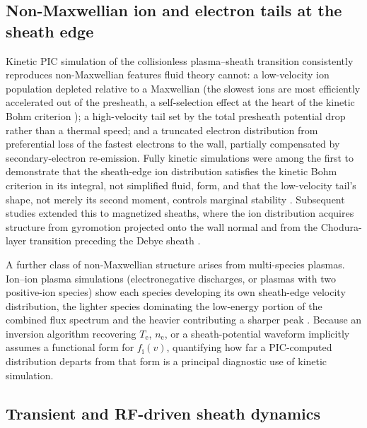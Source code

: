 \subsection{Non-Maxwellian ion and electron tails at the sheath edge}

Kinetic PIC simulation of the collisionless plasma--sheath transition consistently reproduces non-Maxwellian features fluid theory cannot: a low-velocity ion population depleted relative to a Maxwellian (the slowest ions are most efficiently accelerated out of the presheath, a self-selection effect at the heart of the kinetic Bohm criterion \cite{ref0665,ref0666}); a high-velocity tail set by the total presheath potential drop rather than a thermal speed; and a truncated electron distribution from preferential loss of the fastest electrons to the wall, partially compensated by secondary-electron re-emission. Fully kinetic simulations were among the first to demonstrate that the sheath-edge ion distribution satisfies the kinetic Bohm criterion in its integral, not simplified fluid, form, and that the low-velocity tail's shape, not merely its second moment, controls marginal stability \cite{ref0631}. Subsequent studies extended this to magnetized sheaths, where the ion distribution acquires structure from gyromotion projected onto the wall normal and from the Chodura-layer transition preceding the Debye sheath \cite{ref0633,ref0637}.

A further class of non-Maxwellian structure arises from multi-species plasmas. Ion--ion plasma simulations (electronegative discharges, or plasmas with two positive-ion species) show each species developing its own sheath-edge velocity distribution, the lighter species dominating the low-energy portion of the combined flux spectrum and the heavier contributing a sharper peak \cite{ref0655}. Because an inversion algorithm recovering $T_{\mathrm{e}}$, $n_{\mathrm{e}}$, or a sheath-potential waveform implicitly assumes a functional form for $f_{\mathrm{i}}(v)$, quantifying how far a PIC-computed distribution departs from that form is a principal diagnostic use of kinetic simulation.

\subsection{Transient and RF-driven sheath dynamics}

